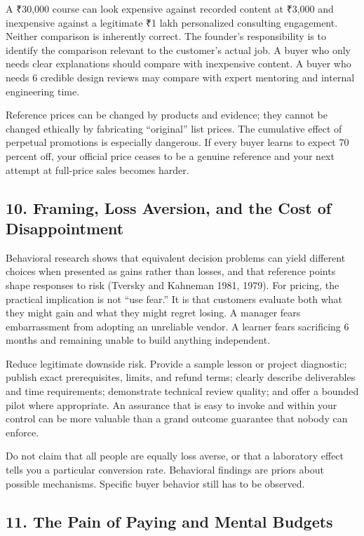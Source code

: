 A ₹30,000 course can look expensive against recorded content at ₹3,000 and inexpensive against a legitimate ₹1 lakh personalized consulting engagement. Neither comparison is inherently correct. The founder's responsibility is to identify the comparison relevant to the customer's actual job. A buyer who only needs clear explanations should compare with inexpensive content. A buyer who needs 6 credible design reviews may compare with expert mentoring and internal engineering time.

Reference prices can be changed by products and evidence; they cannot be changed ethically by fabricating ``original'' list prices. The cumulative effect of perpetual promotions is especially dangerous. If every buyer learns to expect 70 percent off, your official price ceases to be a genuine reference and your next attempt at full-price sales becomes harder.

\subsection*{10. Framing, Loss Aversion, and the Cost of Disappointment}

Behavioral research shows that equivalent decision problems can yield different choices when presented as gains rather than losses, and that reference points shape responses to risk (Tversky and Kahneman 1981, 1979). For pricing, the practical implication is not ``use fear.'' It is that customers evaluate both what they might gain and what they might regret losing. A manager fears embarrassment from adopting an unreliable vendor. A learner fears sacrificing 6 months and remaining unable to build anything independent.

Reduce legitimate downside risk. Provide a sample lesson or project diagnostic; publish exact prerequisites, limits, and refund terms; clearly describe deliverables and time requirements; demonstrate technical review quality; and offer a bounded pilot where appropriate. An assurance that is easy to invoke and within your control can be more valuable than a grand outcome guarantee that nobody can enforce.

Do not claim that all people are equally loss averse, or that a laboratory effect tells you a particular conversion rate. Behavioral findings are priors about possible mechanisms. Specific buyer behavior still has to be observed.

\subsection*{11. The Pain of Paying and Mental Budgets}

